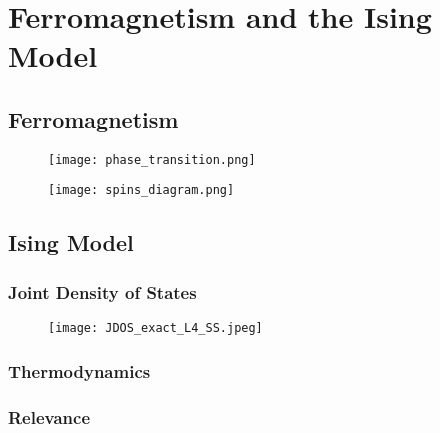 \chapter{Ferromagnetism and the Ising Model}

\section{Ferromagnetism}

\begin{figure}[h]
	\texttt{[image: phase\_transition.png]}
	\centering
\end{figure}

\begin{figure}[h]
	\texttt{[image: spins\_diagram.png]}
	\centering
\end{figure}


\section{Ising Model}

\subsection{Joint Density of States}


\begin{figure}[h]
	\texttt{[image: JDOS\_exact\_L4\_SS.jpeg]}
	\centering
\end{figure}





\subsection{Thermodynamics}

\subsection{Relevance}
